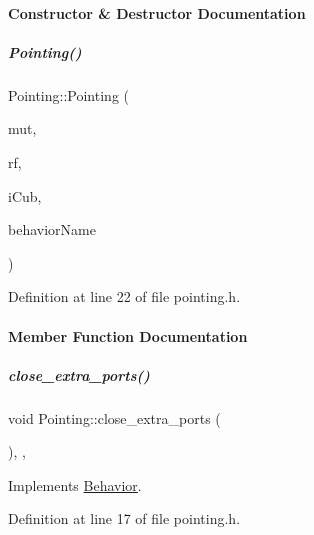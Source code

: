 \paragraph{Constructor \& Destructor Documentation}
\mbox{\label{group__behaviorManager_a9c8ff6e312704973cd3fac5b955bf613}} 
\subparagraph{\texorpdfstring{Pointing()}{Pointing()}}
{\footnotesize\ttfamily Pointing\+::\+Pointing (\begin{DoxyParamCaption}\item[{yarp\+::os\+::\+Mutex $\ast$}]{mut,  }\item[{yarp\+::os\+::\+Resource\+Finder \&}]{rf,  }\item[{\hyperlink{group__icubclient__clients_classicubclient_1_1ICubClient}{icubclient\+::\+I\+Cub\+Client} $\ast$}]{i\+Cub,  }\item[{std\+::string}]{behavior\+Name }\end{DoxyParamCaption})\hspace{0.3cm}{\ttfamily [inline]}}



Definition at line 22 of file pointing.\+h.



\paragraph{Member Function Documentation}
\mbox{\label{group__behaviorManager_a28ede20962e35d2ec2680f66ba371a0f}} 
\subparagraph{\texorpdfstring{close\+\_\+extra\+\_\+ports()}{close\_extra\_ports()}}
{\footnotesize\ttfamily void Pointing\+::close\+\_\+extra\+\_\+ports (\begin{DoxyParamCaption}{ }\end{DoxyParamCaption})\hspace{0.3cm}{\ttfamily [inline]}, {\ttfamily [protected]}, {\ttfamily [virtual]}}



Implements \hyperlink{group__behaviorManager_affd22d1516cd32ff4f42694a1e6f9ab1}{Behavior}.



Definition at line 17 of file pointing.\+h.

